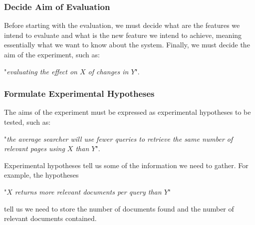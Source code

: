 \documentclass{article}
\begin{document}
\subsubsection{Decide Aim of Evaluation}
Before starting with the evaluation, we must decide what are the features we intend to evaluate and what is the new feature we intend to achieve, meaning essentially what we want to know about the system.
Finally, we must decide the aim of the experiment, such as:
\begin{center}
    "\textit{evaluating the effect on $X$ of changes in $Y$}".
\end{center}

\subsubsection{Formulate Experimental Hypotheses}
The aims of the experiment must be expressed as experimental hypotheses to be tested, such as:
\begin{center}
    "\textit{the average searcher will use fewer queries to retrieve the same number of relevant pages using $X$ than $Y$}".
\end{center}
Experimental hypotheses tell us some of the information we need to gather. For example, the hypotheses
\begin{center}
    "\textit{$X$ returns more relevant documents per query than $Y$}"
\end{center}
tell us we need to store the number of documents found and the number of relevant documents contained.
\end{document}
